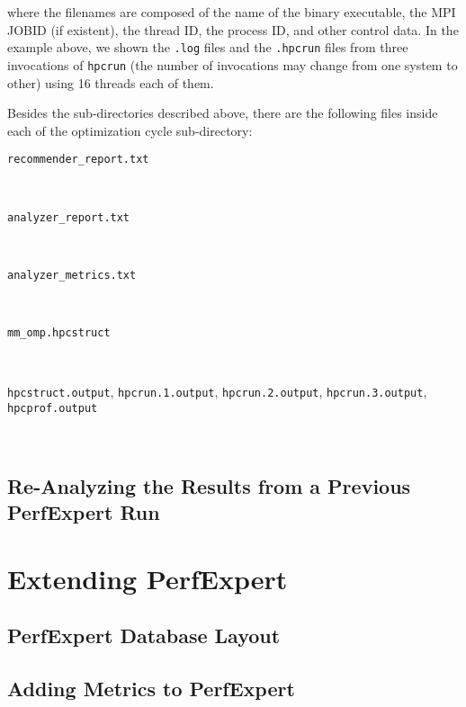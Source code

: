 \noindent where the filenames are composed of the name of the binary executable, the MPI JOBID (if existent), the thread ID, the process ID, and other control data. In the example above, we shown the \texttt{.log} files and the \texttt{.hpcrun} files from three invocations of \texttt{hpcrun} (the number of invocations may change from one system to other) using 16 threads each of them.

Besides the sub-directories described above, there are the following files inside each of the optimization cycle sub-directory:

\begin{description}
	\item[\texttt{recommender\_report.txt}]\hfill \\

	\item[\texttt{analyzer\_report.txt}]\hfill \\

	\item[\texttt{analyzer\_metrics.txt}]\hfill \\

	\item[\texttt{mm\_omp.hpcstruct}]\hfill \\

	\item[\texttt{hpcstruct.output}, \texttt{hpcrun.1.output}, \texttt{hpcrun.2.output}, \texttt{hpcrun.3.output}, \texttt{hpcprof.output}]\hfill \\

\end{description}

\section{Re-Analyzing the Results from a Previous PerfExpert Run}

\chapter{Extending PerfExpert}
\label{extending}

\section{PerfExpert Database Layout}

\section{Adding Metrics to PerfExpert}

